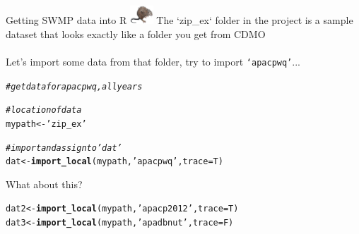 \documentclass[xcolor=dvipsnames]{beamer}\usepackage[]{graphicx}\usepackage[]{color}
\makeatletter
\newcommand{\hlstr}[1]{\textcolor[rgb]{0.192,0.494,0.8}{#1}}%
\newcommand{\hlcom}[1]{\textcolor[rgb]{0.678,0.584,0.686}{\textit{#1}}}%
\newcommand{\hlstd}[1]{\textcolor[rgb]{0.345,0.345,0.345}{#1}}%
\newcommand{\hlkwb}[1]{\textcolor[rgb]{0.69,0.353,0.396}{#1}}%
\newcommand{\hlkwc}[1]{\textcolor[rgb]{0.333,0.667,0.333}{#1}}%
\newcommand{\hlkwd}[1]{\textcolor[rgb]{0.737,0.353,0.396}{\textbf{#1}}}%
\newenvironment{kframe}{%
 \def\at@end@of@kframe{}%
 \ifinner\ifhmode%
  \def\at@end@of@kframe{\end{minipage}}%
  \begin{minipage}{\columnwidth}%
 \fi\fi%
 \def\FrameCommand##1{\hskip\@totalleftmargin \hskip-\fboxsep
 \colorbox{shadecolor}{##1}\hskip-\fboxsep
     \hskip-\linewidth \hskip-\@totalleftmargin \hskip\columnwidth}%
 \MakeFramed {\advance\hsize-\width
   \@totalleftmargin\z@ \linewidth\hsize
   \@setminipage}}%
 {\par\unskip\endMakeFramed%
 \at@end@of@kframe}
\newenvironment{knitrout}{}{} %
\makeatother
\begin{document}
\begin{frame}[fragile]{Getting SWMP data into R \includegraphics[width = 0.065\textwidth]{imgs/swmprat.png}}
\onslide<+->
The `zip\_ex` folder in the project is a sample dataset that looks exactly like a folder you get from CDMO \\~\\
Let's import some data from that folder, try to import \texttt{`apacpwq'}...
\onslide<+->
\begin{knitrout}\scriptsize
{}\color{fgcolor}\begin{kframe}
\begin{alltt}
\hlcom{# get data for apacpwq, all years}

\hlcom{# location of data}
\hlstd{mypath} \hlkwb{<-} \hlstr{'zip_ex'}

\hlcom{# import and assign to 'dat'}
\hlstd{dat} \hlkwb{<-} \hlkwd{import_local}\hlstd{(mypath,} \hlstr{'apacpwq'}\hlstd{,} \hlkwc{trace} \hlstd{= T)}
\end{alltt}
\end{kframe}
\end{knitrout}
\onslide<+->
What about this?
\begin{knitrout}\scriptsize
{}\color{fgcolor}\begin{kframe}
\begin{alltt}
\hlstd{dat2} \hlkwb{<-} \hlkwd{import_local}\hlstd{(mypath,} \hlstr{'apacp2012'}\hlstd{,} \hlkwc{trace} \hlstd{= T)}
\hlstd{dat3} \hlkwb{<-} \hlkwd{import_local}\hlstd{(mypath,} \hlstr{'apadbnut'}\hlstd{,} \hlkwc{trace} \hlstd{= F)}
\end{alltt}
\end{kframe}
\end{knitrout}

\end{frame}
\end{document}
